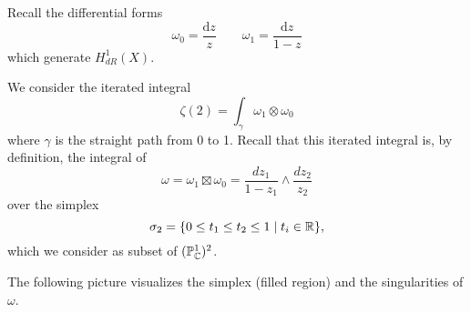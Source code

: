 
Recall the differential forms
\[
\omega_0 = \frac{\mathrm{d}z}{z} \qquad \omega_1 = \frac{\mathrm{d}z}{1-z}
\]
which generate $H^1_{dR}(X)$.

We consider the iterated integral
\[ \zeta(2) = \int_\gamma \omega_1 \otimes \omega_0 \]
where $\gamma$ is the straight path from 0 to 1.
Recall that this iterated integral is, by definition, the integral of
\[
\omega = \omega_1 \boxtimes \omega_0 = \frac{dz_1}{1-z_1} \wedge \frac{dz_2}{z_2}
\]
over the simplex
\[ \sigma_2 = \{ 0 \le t_1 \le t_2 \le 1 \mid t_i \in \mathbb{R} \}, \]
which we consider as subset of $(\mathbb{P}^1_{\mathbb{C}})^2$.

The following picture visualizes the simplex (filled region) and the singularities of $\omega$.



